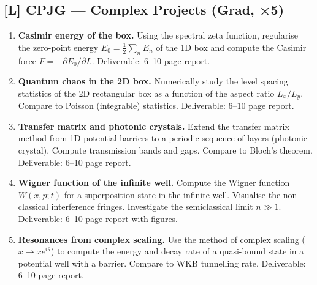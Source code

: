 \subsection*{[L] CPJG — Complex Projects (Grad, ×5)}
\begin{tcolorbox}[gradprobbox, title={CPJG · L01 · Tiers 4–5 · 10–20 hrs each}]
\begin{enumerate}[label=\textbf{PG\arabic*.}]
  \item \textbf{Casimir energy of the box.} Using the spectral zeta function, regularise the zero-point energy $E_0 = \frac{1}{2}\sum_n E_n$ of the 1D box and compute the Casimir force $F = -\partial E_0/\partial L$. Deliverable: 6–10 page report.
  \item \textbf{Quantum chaos in the 2D box.} Numerically study the level spacing statistics of the 2D rectangular box as a function of the aspect ratio $L_x/L_y$. Compare to Poisson (integrable) statistics. Deliverable: 6–10 page report.
  \item \textbf{Transfer matrix and photonic crystals.} Extend the transfer matrix method from 1D potential barriers to a periodic sequence of layers (photonic crystal). Compute transmission bands and gaps. Compare to Bloch's theorem. Deliverable: 6–10 page report.
  \item \textbf{Wigner function of the infinite well.} Compute the Wigner function $W(x,p;t)$ for a superposition state in the infinite well. Visualise the non-classical interference fringes. Investigate the semiclassical limit $n\gg1$. Deliverable: 6–10 page report with figures.
  \item \textbf{Resonances from complex scaling.} Use the method of complex scaling ($x\to xe^{i\theta}$) to compute the energy and decay rate of a quasi-bound state in a potential well with a barrier. Compare to WKB tunnelling rate. Deliverable: 6–10 page report.
\end{enumerate}
\end{tcolorbox}

